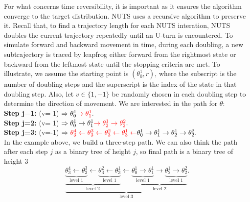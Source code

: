 \documentclass{article}
\begin{document}
 \par For what concerns time reversibility, it is important as it ensures the algorithm converge to the target distribution. NUTS uses a recursive algorithm to preserve it. Recall that, to find a trajectory length for each NUTS interation, NUTS doubles the current trajectory repeatedly until an U-turn is encountered. %
To simulate forward and backward movement in time, during each doubling, a new subtrajectory is traced by leapfrog either forward from the rightmost state or backward from the leftmost state until the stopping criteria are met. To illustrate, we assume the starting point is $(\theta_0^1,r)$, where the subscript is the number of doubling steps and the superscript is the index of the state in that doubling step. Also, let $v\in\{1,-1\}$ be randomly chosen in each doubling step to determine the direction of movement. We are interested in the path for $\theta$:\\
\textbf{Step j=1:}   (v= 1)  $ \Rightarrow \theta_0^1 \textcolor{red}{\rightarrow \theta_1^1}.$ \\
\textbf{Step j=2:}   (v= 1)  $ \Rightarrow \theta_0^1 \rightarrow \theta_1^1 \textcolor{red}{\rightarrow \theta_2^1 \rightarrow \theta_2^2}.$ \\
\textbf{Step j=3:}   (v=-1)  $ \Rightarrow \textcolor{red}{\theta_3^4\leftarrow\theta_3^3\leftarrow\theta_3^2\leftarrow \theta_3^1\leftarrow}\theta_0^1 \rightarrow \theta_1^1 \rightarrow \theta_2^1 \rightarrow \theta_2^2.$ \\
\noindent In the example above, we build a three-step path. We can also think the path after each step $j$ as a binary tree of height $j$, so final path is a binary tree of height 3
$$\underbrace{\underbrace{\underbrace{\theta_3^4\leftarrow\theta_3^3}_{\text{level }1}\leftarrow\underbrace{\theta_3^2\leftarrow \theta_3^1}_{\text{level }1}}_{\text{level }2}\leftarrow\underbrace{\underbrace{\theta_0^1 \rightarrow \theta_1^1}_{\text{level }1} \rightarrow \underbrace{\theta_2^1 \rightarrow \theta_2^2}_{\text{level }1}}_{\text{level }2}}_{\text{level }3}.$$
\end{document}
